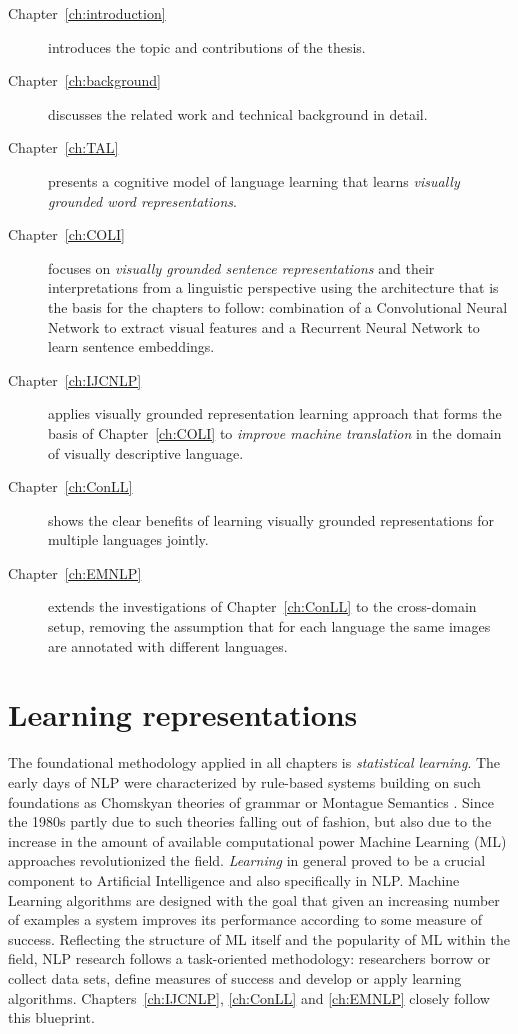 \begin{description}
\item[Chapter~\ref{ch:introduction}] introduces the topic and contributions of
the thesis.

\item[Chapter~\ref{ch:background}] discusses the related work and technical background in detail.

\item[Chapter~\ref{ch:TAL}] presents
a cognitive model of language learning that learns \emph{visually grounded word representations}.

\item[Chapter~\ref{ch:COLI} ] focuses on \emph{visually grounded sentence representations} and their
interpretations from a linguistic perspective using the architecture that is the basis
for the chapters to follow: combination of a Convolutional Neural Network to extract visual features and
a Recurrent Neural Network to learn sentence embeddings.

\item[Chapter~\ref{ch:IJCNLP}] applies visually grounded representation learning approach that forms the
basis of Chapter~\ref{ch:COLI} to \emph{improve machine translation} in the domain of visually descriptive language.

\item[Chapter~\ref{ch:ConLL}] shows the clear benefits of learning visually grounded representations
for multiple languages jointly.

\item[Chapter~\ref{ch:EMNLP}] extends the investigations of Chapter~\ref{ch:ConLL} to the
cross-domain setup, removing the assumption that for each language the same images are annotated
with different languages.
\end{description}



\section{Learning representations}
The foundational methodology applied in all chapters is \emph{statistical learning}.
The early days of NLP were characterized by rule-based systems building on such
foundations as Chomskyan theories of grammar \citep{chomsky2002syntactic} or 
Montague Semantics \citep{montague1970english}.
Since the 1980s partly due to such theories falling out of fashion, 
but also due to the increase in the amount
of available computational power Machine Learning (ML) approaches revolutionized
the field.  \emph{Learning} in general proved to be a crucial component to Artificial Intelligence and also
specifically in NLP. Machine Learning algorithms are designed with the goal that given an increasing
number of examples a system improves its performance according to some measure of success.
Reflecting the structure of ML itself and the popularity of ML within the field, NLP research follows
a task-oriented methodology: researchers borrow or collect data sets, define measures of success and develop or
apply learning algorithms. Chapters~\ref{ch:IJCNLP}, \ref{ch:ConLL} and
\ref{ch:EMNLP}  closely follow this blueprint.

